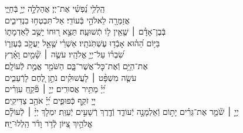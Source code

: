 \documentclass[twoside, openany, parskip=half, 11pt]{book}
\begin{document}
\negline

\ashrei


\begin{narrow}

\hfill \break
הַֽלְלִ֥י נַ֝פְשִׁ֗י אֶת־יְיָ׃ \hfill
אֲהַלְלָ֣ה יְיָ֣ בְּֿחַיָּ֑י \\ אֲזַמְּרָ֖ה לֵאלֹהַ֣י בְּֿעוֹדִֽי׃ \hfill
אַל־תִּבְטְח֥וּ בִנְדִיבִ֑ים \\ בְּֿבֶן־אָדָ֓ם ׀ שֶׁ֤אֵ֖ין ל֥וֹ תְֿשׁוּעָֽה׃ \hfill
תֵּצֵ֣א ר֭וּחוֹ יָשֻׁ֣ב לְֿאַדְמָת֑וֹ \\ בַּיּ֥וֹם הַ֝ה֗וּא אָבְֿד֥וּ עֶשְׁתֹּֽנֹתָֽיו׃ \hfill
אַשְׁרֵ֗י שֶׁ֤אֵ֣ל יַעֲקֹ֣ב בְּֿעֶזְר֑וֹ\\ שִׂ֝בְר֗וֹ עַל־יְיָ֥ אֱלֹהָֽיו׃ \hfill
עֹשֶׂ֤ה ׀ שָׁ֘מַ֤יִם וָאָ֗רֶץ \\ אֶת־הַיָּ֥ם וְֿאֶת־כׇּל־אֲשֶׁר־בָּ֑ם \hfill הַשֹּׁמֵ֖ר אֱמֶ֣ת לְֿעוֹלָֽם׃\\
עֹשֶׂ֤ה מִשְׁפָּ֨ט ׀ לָעֲשׁוּקִ֗ים \hfill נֹתֵ֣ן לֶ֭חֶם לָרְֿעֵבִ֑ים \\ יְ֝יָ֗ מַתִּ֥יר אֲסוּרִֽים׃ \hfill
יְיָ֤ ׀ פֹּ֘קֵ֤חַ עִוְרִ֗ים \\ יְיָ֭ זֹקֵ֣ף כְּֿפוּפִ֑ים \hfill יְ֝יָ֗ אֹהֵ֥ב צַדִּיקִֽים׃\\
יְיָ֤ ׀ שֹׁ֘מֵ֤ר אֶת־גֵּרִ֗ים יָת֣וֹם וְֿאַלְמָנָ֣ה יְֿעוֹדֵ֑ד וְֿדֶ֖רֶךְ רְֿשָׁעִ֣ים יְֿעַוֵּֽת׃ \hfill
יִמְלֹ֤ךְ יְיָ֨ ׀ לְֿעוֹלָ֗ם\\ אֱלֹהַ֣יִךְ צִ֭יּוֹן לְֿדֹ֥ר וָדֹ֗ר \hfill הַֽלְלוּ־יָֽהּ׃




\end{narrow}
\end{document}
